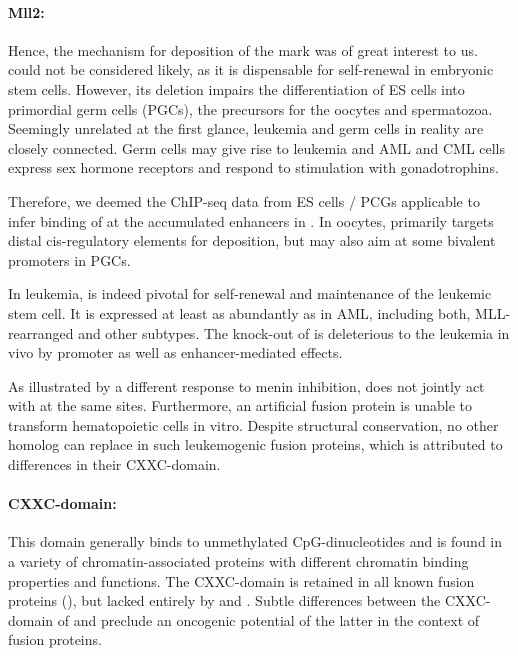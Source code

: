 \paragraph{Mll2:} Hence, the mechanism for deposition of the mark was of great interest to us.  could not be considered likely, as it is dispensable for self-renewal in embryonic stem cells\cite{Glaser2006}. However, its deletion impairs the differentiation of ES cells into primordial germ cells (PGCs)\cite{Lubitz2007}, the precursors for the oocytes and spermatozoa. Seemingly unrelated at the first glance, leukemia and germ cells in reality are closely connected. Germ cells may give rise to leukemia\cite{Ladanyi1990} and AML and CML cells express sex hormone receptors and respond to stimulation with gonadotrophins\cite{Abdelbaset-Ismail2016}. 

Therefore, we deemed the ChIP-seq data from ES cells / PCGs\cite{Hu2017} applicable to infer binding of  at the accumulated enhancers in \mllafnine {}.  In oocytes,   primarily targets distal cis-regulatory elements for \hisfourthree deposition\cite{Hanna2018}, but may also aim at some bivalent promoters in PGCs\cite{Hu2017}. 

In \mllafnine leukemia,  is indeed pivotal for self-renewal and maintenance of the leukemic stem cell\cite{Chen2017a}. It is expressed at least as abundantly as  in AML, including both, MLL-rearranged and other subtypes\cite{Chen2017a}. The knock-out of    is deleterious to the leukemia in vivo\cite{Chen2017a} by promoter as well as enhancer-mediated effects.

As illustrated by a different response to menin inhibition\cite{Chen2019},  does not jointly act with \mllafnine at the same sites. Furthermore, an artificial  fusion protein is unable to transform hematopoietic cells in vitro\cite{Bach2009}. Despite structural conservation, no other  homolog can replace  in such leukemogenic fusion proteins, which is attributed to differences in their CXXC-domain. 

\paragraph{CXXC-domain:}  This domain generally binds to unmethylated CpG-dinucleotides and is found in a variety of chromatin-associated proteins\cite{Xu2018a} with different chromatin binding properties and functions. The CXXC-domain is retained in all known  fusion proteins (\mllfp), but lacked entirely by  and \cite{Xu2018a}. Subtle differences between the CXXC-domain of  and  preclude an oncogenic potential of the latter in the context of fusion proteins\cite{Bach2009}.   

